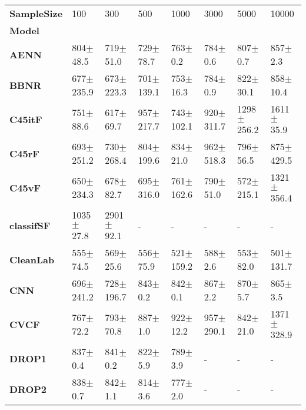 \begin{tabular}{llllllll}
\toprule
\textbf{SampleSize} &             100   &            300   &            500   &              1000  &            3000  &            5000  &            10000 \\
\textbf{Model           } &                   &                  &                  &                    &                  &                  &                  \\
\midrule
\textbf{AENN            } &     804$\pm$ 48.5 &    719$\pm$ 51.0 &    729$\pm$ 78.7 &       763$\pm$ 0.2 &     784$\pm$ 0.6 &     807$\pm$ 0.7 &     857$\pm$ 2.3 \\
\textbf{BBNR            } &    677$\pm$ 235.9 &   673$\pm$ 223.3 &   701$\pm$ 139.1 &      753$\pm$ 16.3 &     784$\pm$ 0.9 &    822$\pm$ 30.1 &    858$\pm$ 10.4 \\
\textbf{C45itF          } &     751$\pm$ 88.6 &    617$\pm$ 69.7 &   957$\pm$ 217.7 &     743$\pm$ 102.1 &   920$\pm$ 311.7 &  1298$\pm$ 256.2 &   1611$\pm$ 35.9 \\
\textbf{C45rF           } &    693$\pm$ 251.2 &   730$\pm$ 268.4 &   804$\pm$ 199.6 &      834$\pm$ 21.0 &   962$\pm$ 518.3 &    796$\pm$ 56.5 &   875$\pm$ 429.5 \\
\textbf{C45vF           } &    650$\pm$ 234.3 &    678$\pm$ 82.7 &   695$\pm$ 316.0 &     761$\pm$ 162.6 &    790$\pm$ 51.0 &   572$\pm$ 215.1 &  1321$\pm$ 356.4 \\
\textbf{classifSF       } &    1035$\pm$ 27.8 &   2901$\pm$ 92.1 &                - &                  - &                - &                - &                - \\
\textbf{CleanLab        } &     555$\pm$ 74.5 &    569$\pm$ 25.6 &    556$\pm$ 75.9 &     521$\pm$ 159.2 &     588$\pm$ 2.6 &    553$\pm$ 82.0 &   501$\pm$ 131.7 \\
\textbf{CNN             } &    696$\pm$ 241.2 &   728$\pm$ 196.7 &     843$\pm$ 0.2 &       842$\pm$ 0.1 &     867$\pm$ 2.2 &     870$\pm$ 5.7 &     865$\pm$ 3.5 \\
\textbf{CVCF            } &     767$\pm$ 72.2 &    793$\pm$ 70.8 &     887$\pm$ 1.0 &      922$\pm$ 12.2 &   957$\pm$ 290.1 &    842$\pm$ 21.0 &  1371$\pm$ 328.9 \\
\textbf{DROP1           } &      837$\pm$ 0.4 &     841$\pm$ 0.2 &     822$\pm$ 5.9 &       789$\pm$ 3.9 &                - &                - &                - \\
\textbf{DROP2           } &      838$\pm$ 0.7 &     842$\pm$ 1.1 &     814$\pm$ 3.6 &       777$\pm$ 2.0 &                - &                - &                - \\

\end{tabular}
